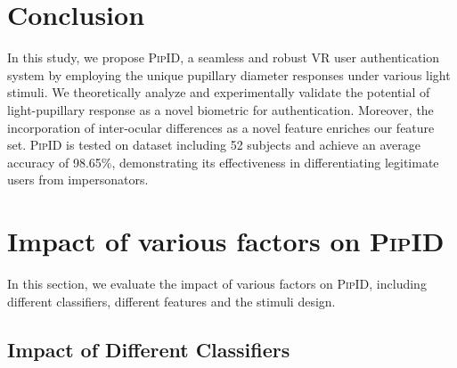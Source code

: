 \documentclass[sigconf]{acmart}
\newcommand{\sysname}{\textsc{PipID}\xspace}
\begin{document}
\section{Conclusion}
\label{sec:conclusion}
In this study, we propose \sysname,  a seamless and robust VR user authentication system by employing the unique pupillary diameter responses under various light stimuli. We theoretically analyze and experimentally validate the potential of light-pupillary response as a novel biometric for authentication. Moreover, the incorporation of inter-ocular differences as a novel feature enriches our feature set. \sysname is tested on dataset including 52 subjects and achieve an average accuracy of 98.65\%, demonstrating its effectiveness in differentiating legitimate users from impersonators.





\appendix




\section{Impact of various factors on \sysname}
\label{sec:impact of various factors}
In this section, we evaluate the impact of various factors on \sysname, including different classifiers, different features and the stimuli design.

\subsection{Impact of Different Classifiers}
\label{sec:impact of classifiers}
\end{document}
